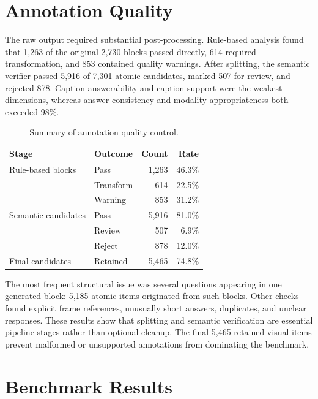 \section{Annotation Quality}
\label{sec:annotation_quality}

The raw output required substantial post-processing. Rule-based analysis found
that 1,263 of the original 2,730 blocks passed directly, 614 required
transformation, and 853 contained quality warnings. After splitting, the
semantic verifier passed 5,916 of 7,301 atomic candidates, marked 507 for
review, and rejected 878. Caption answerability and caption support were the
weakest dimensions, whereas answer consistency and modality appropriateness
both exceeded 98\%.

\begin{table}[ht]
    \centering
    \caption{Summary of annotation quality control.}
    \label{tab:annotation_quality}
    \begin{tabular}{llrr}
        \toprule
        \textbf{Stage} & \textbf{Outcome} & \textbf{Count} & \textbf{Rate} \\
        \midrule
        Rule-based blocks & Pass & 1,263 & 46.3\% \\
                          & Transform & 614 & 22.5\% \\
                          & Warning & 853 & 31.2\% \\
        \midrule
        Semantic candidates & Pass & 5,916 & 81.0\% \\
                            & Review & 507 & 6.9\% \\
                            & Reject & 878 & 12.0\% \\
        \midrule
        Final candidates & Retained & 5,465 & 74.8\% \\
        \bottomrule
    \end{tabular}
\end{table}

The most frequent structural issue was several questions appearing in one
generated block: 5,185 atomic items originated from such blocks. Other checks
found explicit frame references, unusually short answers, duplicates, and
unclear responses. These results show that splitting and semantic verification
are essential pipeline stages rather than optional cleanup. The final 5,465
retained visual items prevent malformed or unsupported annotations from
dominating the benchmark.


\section{Benchmark Results}
\label{sec:benchmark_results}

